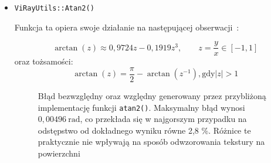 \begin{enumerate}



\begin{itemize}
\item \texttt{ViRayUtils::Atan2()}

Funkcja ta opiera swoje działanie na następującej obserwacji~\cite{ATAN_APPROX}:

\begin{equation}
\arctan(z)\approx 0,9724z - 0,1919z^3,\qquad z=\frac{y}{x}\in[-1, 1]
\end{equation}
oraz tożsamości:
\begin{equation}
\arctan(z) = \frac{\pi}{2} - \arctan\left(z^{-1}\right), \mathrm{gdy} \left| z \right| > 1
\end{equation}

\begin{figure}[H]
\centering
{}
\caption[Błąd bezwzględny oraz względny generowany przez przybliżoną implementację funkcji \texttt{atan2()}]{Błąd bezwzględny oraz względny generowany przez przybliżoną implementację funkcji \texttt{atan2()}. Maksymalny błąd wynosi $0,00496\ \mathrm{rad}$, co przekłada się w najgorszym przypadku na odstępstwo od dokładnego wyniku równe 2,8 \%. Różnice te praktycznie nie wpływają na sposób odwzorowania tekstury na powierzchni}
\label{ch3:img:atan2_error}
\end{figure}



\end{itemize}
\end{enumerate}
